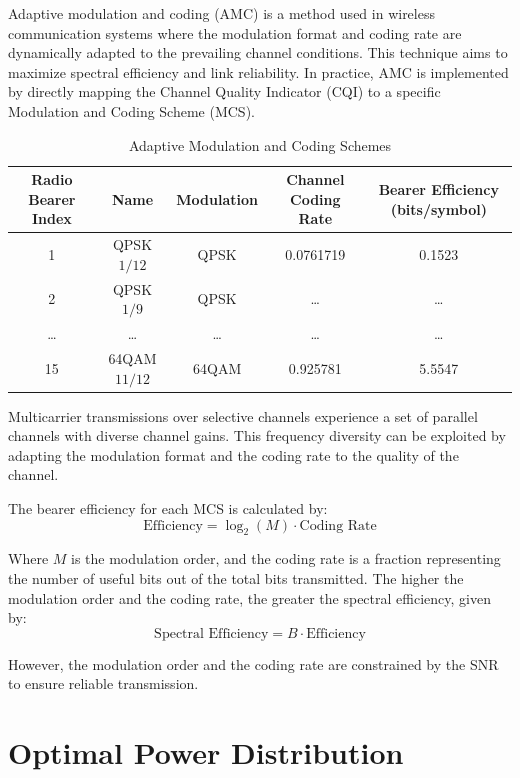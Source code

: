Adaptive modulation and coding (AMC) is a method used in wireless communication systems where the modulation format and coding rate are dynamically adapted to the prevailing channel conditions. This technique aims to maximize spectral efficiency and link reliability. In practice, AMC is implemented by directly mapping the Channel Quality Indicator (CQI) to a specific Modulation and Coding Scheme (MCS).

\begin{table}[htbp]
\centering
\caption{Adaptive Modulation and Coding Schemes}
\begin{tabular}{|c|c|c|c|c|}
\hline
Radio Bearer Index & Name & Modulation & Channel Coding Rate & Bearer Efficiency (bits/symbol) \\
\hline
1 & QPSK \(1/12\) & QPSK & 0.0761719 & 0.1523 \\
2 & QPSK \(1/9\) & QPSK & \ldots & \ldots \\
\ldots & \ldots & \ldots & \ldots & \ldots \\
15 & 64QAM \(11/12\) & 64QAM & 0.925781 & 5.5547 \\
\hline
\end{tabular}
\end{table}

Multicarrier transmissions over selective channels experience a set of parallel channels with diverse channel gains. This frequency diversity can be exploited by adapting the modulation format and the coding rate to the quality of the channel.

The bearer efficiency for each MCS is calculated by:
\begin{equation}
\text{Efficiency} = \log_2(M) \cdot \text{Coding Rate}
\end{equation}

Where \( M \) is the modulation order, and the coding rate is a fraction representing the number of useful bits out of the total bits transmitted. The higher the modulation order and the coding rate, the greater the spectral efficiency, given by:
\begin{equation}
\text{Spectral Efficiency} = B \cdot \text{Efficiency}
\end{equation}

However, the modulation order and the coding rate are constrained by the SNR to ensure reliable transmission.





\section*{Optimal Power Distribution}

